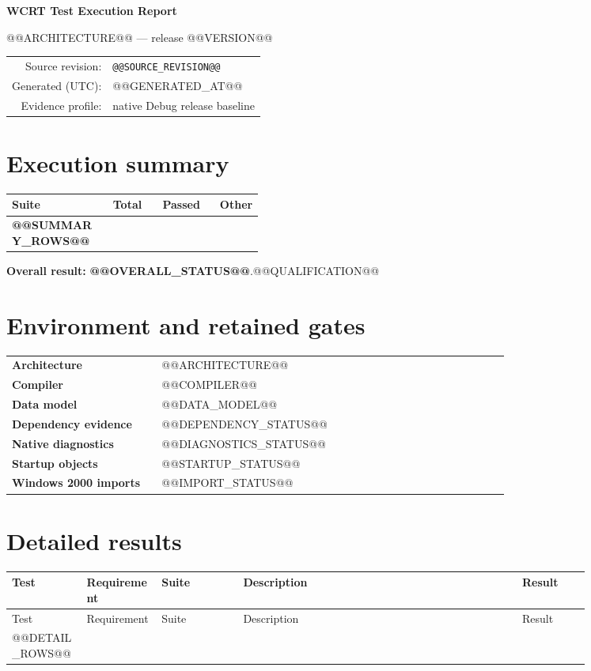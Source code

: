 \documentclass[10pt,letterpaper]{article}
\begin{document}
\begin{center}
{\Huge\bfseries\color{wcrtblue} WCRT Test Execution Report}\par
\vspace{6pt}
{\Large @@ARCHITECTURE@@ --- release @@VERSION@@}\par
\vspace{10pt}
\begin{tabular}{rl}
Source revision: & \texttt{@@SOURCE_REVISION@@}\\
Generated (UTC): & @@GENERATED_AT@@\\
Evidence profile: & native Debug release baseline\\
\end{tabular}
\end{center}

\section*{Execution summary}
\begin{tabular}{>{\bfseries}p{0.37\linewidth}rrr}
\toprule
Suite & Total & Passed & Other\\
\midrule
@@SUMMARY_ROWS@@
\bottomrule
\end{tabular}

\vspace{8pt}
\textbf{Overall result:} \textcolor{@@OVERALL_COLOR@@}{\textbf{@@OVERALL_STATUS@@}}.@@QUALIFICATION@@

\section*{Environment and retained gates}
\begin{tabular}{>{\bfseries}p{0.28\linewidth}p{0.65\linewidth}}
Architecture & @@ARCHITECTURE@@\\
Compiler & @@COMPILER@@\\
Data model & @@DATA_MODEL@@\\
Dependency evidence & @@DEPENDENCY_STATUS@@\\
Native diagnostics & @@DIAGNOSTICS_STATUS@@\\
Startup objects & @@STARTUP_STATUS@@\\
Windows 2000 imports & @@IMPORT_STATUS@@\\
\end{tabular}

\section*{Detailed results}
\begin{longtable}{p{0.11\linewidth}p{0.11\linewidth}p{0.12\linewidth}p{0.41\linewidth}p{0.10\linewidth}}
\toprule
Test & Requirement & Suite & Description & Result\\
\midrule
\endfirsthead
\toprule
Test & Requirement & Suite & Description & Result\\
\midrule
\endhead
@@DETAIL_ROWS@@
\bottomrule
\end{longtable}
\end{document}
